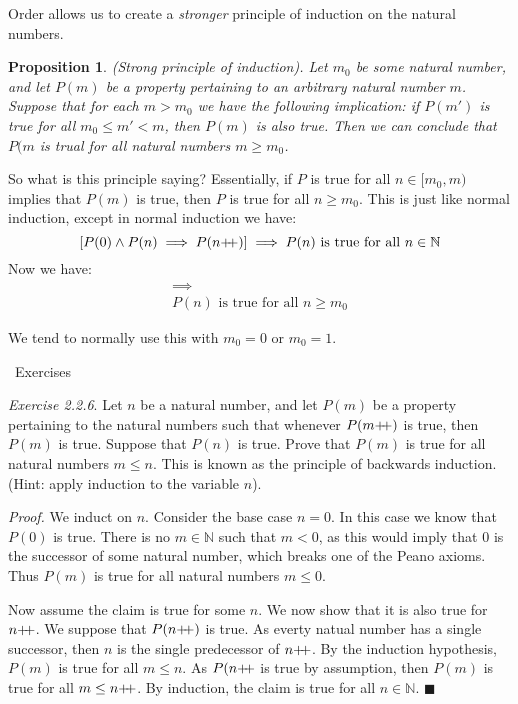 \documentclass{article}
\newtheorem{proposition}{Proposition}[subsection]
\newcommand{\N}{\mathbb{N}}
\newcommand{\exercisesline}{	%
    \begin{center}
    \textemdash\ Exercises\ \textemdash
    \end{center}
}
\newcommand{\pp}{\mathbin{+\mkern-5mu+}}
\begin{document}
Order allows us to create a \emph{stronger} principle of induction 
on the natural numbers.

\begin{proposition}
	(Strong principle of induction). Let $m_0$ be some natural 
	number, and let $P(m)$ be a property pertaining to an arbitrary
	natural number $m$. Suppose that for each $m > m_0$ we have 
	the following implication: if $P(m')$ is true for 
	all $m_0 \leq m' < m$, then $P(m)$ is also true. Then 
	we can conclude that $P(m$ is trual for all natural numbers $m \geq m_0$.
\end{proposition}

So what is this principle saying? Essentially, if $P$ is 
true for all $n \in [m_0, m)$ implies that $P(m)$ is true, then 
$P$ is true for all $n \geq m_0$. This is just like normal induction,
except in normal induction we have: 
$$
[P(0) \land P(n) \implies P(n\pp)] \implies P(n) \text{ is true for all } n \in \N
$$
Now we have: 
\begin{align*}
[P(m_0) \land P(m') \text{ is true for all } m_0 \leq m' < m \implies P(m)] 
\implies \\
P(n) \text{ is true for all } n \geq m_0
\end{align*}

We tend to normally use this with $m_0 = 0$ or $m_0 = 1$.


\exercisesline

\emph{Exercise 2.2.6}. Let $n$ be a natural number, and let $P(m)$ 
be a property pertaining to the natural numbers such that whenever
$P(m\pp)$ is true, then $P(m)$ is true. Suppose that $P(n)$ is true.
Prove that $P(m)$ is true for all natural numbers $m \leq n$.
This is known as the principle of backwards induction. (Hint: apply 
induction to the variable $n$).

\emph{Proof.} We induct on $n$. Consider the base case $n = 0$. In this 
case we know that $P(0)$ is true. There is no $m\in\N$ such that $m <0$, 
as this would imply that $0$ is the successor of some natural number,
which breaks one of the Peano axioms. Thus $P(m)$ is true for all
natural numbers $m \leq 0$. 

Now assume the claim is true for some $n$. We now show that it 
is also true for $n\pp$. We suppose that $P(n\pp)$ is true. As
everty natual number has a single successor, then $n$ is the single
predecessor of $n\pp$. By the induction hypothesis, $P(m)$ is true
for all $m \leq n$. As $P(n\pp$ is true by assumption, then $P(m)$
is true for all $m \leq n\pp$. By induction, the claim is true for
all $n \in \N$. \hfill $\blacksquare$
\end{document}
